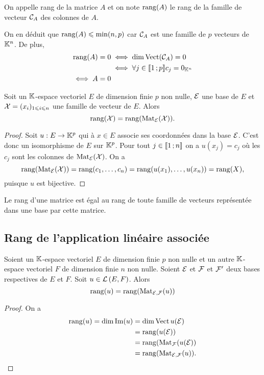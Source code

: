 \begin{defdef}
  On appelle rang de la matrice $A$ et on note $\operatorname{rang}(A)$  le rang de la famille de vecteur $\mathcal{C}_A$ des colonnes de $A$.
\end{defdef}

On en déduit que $\operatorname{rang}(A) \leqslant \min(n,p)$ car $\mathcal{C}_A$ est une famille de $p$ vecteurs de $\mathbb{K}^n$. De plus,
\begin{align}
  \operatorname{rang}(A) = 0 &\iff \dim \operatorname{Vect}(\mathcal{C}_A)=0 \\
  &\iff \forall j \in \mathopen{\llbracket}1\mathclose{}\mathpunct{};p\mathclose{\rrbracket} c_j = 0_{\mathbb{K}^n} \\
  \iff A=0
\end{align}

\begin{prop}
  Soit un $\mathbb{K}$-espace vectoriel $E$ de dimension finie $p$ non nulle, $\mathcal{E}$ une base de $E$ et $\mathcal{X}=(x_i)_{1\leqslant i\leqslant n}$ une famille de vecteur de $E$. Alors
  \begin{equation}
    \operatorname{rang}(\mathcal{X})=\operatorname{rang}(\mathrm{Mat}_{\mathcal{E}}(\mathcal{X})).
  \end{equation}
\end{prop}
\begin{proof}
  Soit $u: E \rightarrow \mathbb{K}^p$ qui à $x \in E$ associe ses coordonnées dans la base $\mathcal{E}$. C'est donc un isomorphisme de $E$ sur $\mathbb{K}^p$. Pour tout $j \in \mathopen{\llbracket}1\mathclose{}\mathpunct{};n\mathclose{\rrbracket}$ on a $u(x_j)=c_j$ où les $c_j$ sont les colonnes de $\mathrm{Mat}_{\mathcal{E}}(\mathcal{X})$. On a
  \begin{equation}
    \operatorname{rang}(\mathrm{Mat}_{\mathcal{E}}(\mathcal{X})) = \operatorname{rang}(c_1,\ldots,c_n) = \operatorname{rang}(u(x_1),\ldots,u(x_n))=\operatorname{rang}(X),
  \end{equation}
  puisque $u$ est bijective.
\end{proof}

\begin{corth}
  Le rang d'une matrice est égal au rang de toute famille de vecteurs représentée dans une base par cette matrice.
\end{corth}

\subsection{Rang de l'application linéaire associée}

\begin{theo}
  Soient un $\mathbb{K}$-espace vectoriel $E$ de dimension finie $p$ non nulle et un autre $\mathbb{K}$-espace vectoriel $F$ de dimension finie $n$ non nulle. Soient $\mathcal{E}$ et $\mathcal{F}$ et $\mathcal{F}'$ deux bases respectives de $E$ et $F$. Soit $u \in \mathcal{L}\left(E,F\right)$. Alors
  \begin{equation}
    \operatorname{rang}(u) = \operatorname{rang}(\mathrm{Mat}_{\mathcal{E},\mathcal{F}}(u))
  \end{equation}
\end{theo}
\begin{proof}
  On a
  \begin{align}
    \operatorname{rang}(u) = \dim\operatorname{Im}(u) &= \dim \operatorname{Vect} u(\mathcal{E}) \\
    &= \operatorname{rang}(u(\mathcal{E}))\\
    &=\operatorname{rang}(\mathrm{Mat}_{\mathcal{F}}(u(\mathcal{E}))\\
    &=\operatorname{rang}(\mathrm{Mat}_{\mathcal{E},\mathcal{F}}(u)).
  \end{align}
\end{proof}

